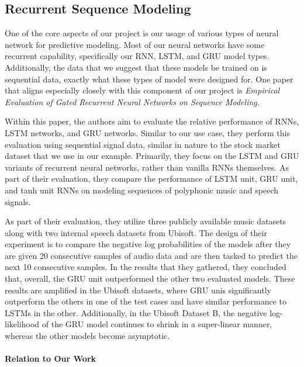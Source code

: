 \documentclass{article}
\begin{document}
    \subsection{Recurrent Sequence Modeling}

    One of the core aspects of our project is our usage of various types of neural network for predictive modeling.
    Most of our neural networks have some recurrent capability, specifically our RNN, LSTM, and GRU model types.
    Additionally, the data that we suggest that these models be trained on is sequential data, exactly what these
    types of model were designed for.  One paper that aligns especially closely with this component of our project
    is \textit{Empirical Evaluation of Gated Recurrent Neural Networks on Sequence Modeling}\cite{recurrentModeling}.

    Within this paper, the authors aim to evaluate the relative performance of RNNs, LSTM networks, and GRU networks.
    Similar to our use case, they perform this evaluation using sequential signal data, similar in nature to the
    stock market dataset that we use in our example.  Primarily, they focus on the LSTM and GRU variants of
    recurrent neural networks, rather than vanilla RNNs themselves.  As part of their evaluation, they compare
    the performance of LSTM unit, GRU unit, and tanh unit RNNs on modeling sequences of polyphonic music and
    speech signals.

    As part of their evaluation, they utilize three publicly available music datasets along with two internal speech
    datasets from Ubisoft.  The design of their experiment is to compare the negative log probabilities of the models
    after they are given 20 consecutive samples of audio data and are then tasked to predict the next 10 consecutive
    samples.  In the results that they gathered, they concluded that, overall, the GRU unit outperformed the other
    two evaluated models.  These results are amplified in the Ubisoft datasets, where GRU unis significantly
    outperform the others in one of the test cases and have similar performance to LSTMs in the other.  Additionally,
    in the Ubisoft Dataset B, the negative log-likelihood of the GRU model continues to shrink in a super-linear manner,
    whereas the other models become asymptotic.

    \paragraph{Relation to Our Work}
\end{document}
